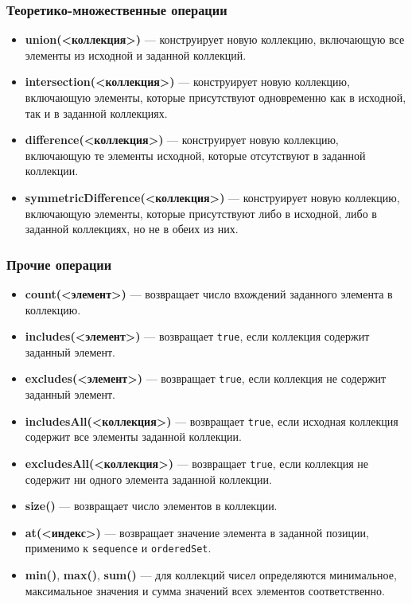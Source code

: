 \documentclass[a4paper,12pt]{article}
\begin{document}
\subsubsection{Теоретико-множественные операции}

\begin{itemize}
    \item \textbf{union(<коллекция>)} — конструирует новую коллекцию, включающую все элементы из исходной и заданной коллекций.
    \item \textbf{intersection(<коллекция>)} — конструирует новую коллекцию, включающую элементы, которые присутствуют одновременно как в исходной, так и в заданной коллекциях.
    \item \textbf{difference(<коллекция>)} — конструирует новую коллекцию, включающую те элементы исходной, которые отсутствуют в заданной коллекции.
    \item \textbf{symmetricDifference(<коллекция>)} — конструирует новую коллекцию, включающую элементы, которые присутствуют либо в исходной, либо в заданной коллекциях, но не в обеих из них.
\end{itemize}

\subsubsection{Прочие операции}

\begin{itemize}
    \item \textbf{count(<элемент>)} — возвращает число вхождений заданного элемента в коллекцию.
    \item \textbf{includes(<элемент>)} — возвращает \texttt{true}, если коллекция содержит заданный элемент.
    \item \textbf{excludes(<элемент>)} — возвращает \texttt{true}, если коллекция не содержит заданный элемент.
    \item \textbf{includesAll(<коллекция>)} — возвращает \texttt{true}, если исходная коллекция содержит все элементы заданной коллекции.
    \item \textbf{excludesAll(<коллекция>)} — возвращает \texttt{true}, если коллекция не содержит ни одного элемента заданной коллекции.
    \item \textbf{size()} — возвращает число элементов в коллекции.
    \item \textbf{at(<индекс>)} — возвращает значение элемента в заданной позиции, применимо к \texttt{sequence} и \texttt{orderedSet}.
    \item \textbf{min()}, \textbf{max()}, \textbf{sum()} — для коллекций чисел определяются минимальное, максимальное значения и сумма значений всех элементов соответственно.
\end{itemize}
\end{document}

